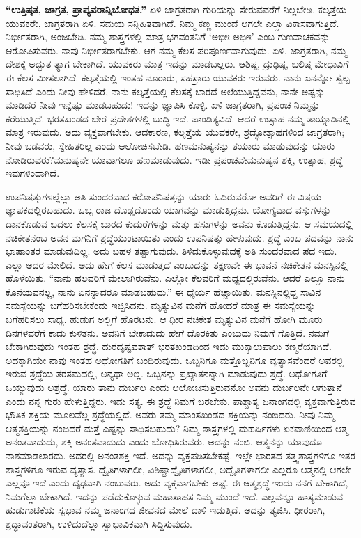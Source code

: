 \textbf{“ಉತ್ತಿಷ್ಠತ, ಜಾಗ್ರತ, ಪ್ರಾಪ್ಯವರಾನ್ನಿಬೋಧತ.”} ಏಳಿ ಜಾಗ್ರತರಾಗಿ ಗುರಿಯನ್ನು ಸೇರುವವರೆಗೆ ನಿಲ್ಲಬೇಡಿ. ಕಲ್ಕತ್ತೆಯ ಯುವಕರೇ, ಜಾಗ್ರತರಾಗಿ ಏಳಿ. ಸಮಯ ಸನ್ನಿಹಿತವಾಗಿದೆ. ನಿಮ್ಮ ಕಣ್ಣ ಮುಂದೆ ಆಗಲೇ ಎಲ್ಲಾ ವಿಕಾಸವಾಗುತ್ತಿದೆ. ನಿರ್ಭೀತರಾಗಿ, ಅಂಜಬೇಡಿ. ನಮ್ಮ ಶಾಸ್ತ್ರಗಳಲ್ಲಿ ಮಾತ್ರ ಭಗವಂತನಿಗೆ ‘ಅಭೀಃ ಅಭೀಃ’ ಎಂಬ ಗುಣವಾಚಕವನ್ನು ಆರೋಪಿಸುವರು. ನಾವು ನಿರ್ಭೀತರಾಗಬೇಕು. ಆಗ ನಮ್ಮ ಕೆಲಸ ಪರಿಪೂರ್ಣವಾಗುವುದು. ಏಳಿ, ಜಾಗ್ರತರಾಗಿ, ನಮ್ಮ ದೇಶಕ್ಕೆ ಅದ್ಭುತ ತ್ಯಾಗ ಬೇಕಾಗಿದೆ. ಯುವಕರು ಮಾತ್ರ ಇದನ್ನು ಮಾಡಬಲ್ಲರು. ಆಶಿಷ್ಠ, ದ್ರುಢಿಷ್ಠ, ಬಲಿಷ್ಠ ಮೇಧಾವಿಗೆ ಈ ಕೆಲಸ ಮೀಸಲಾಗಿದೆ. ಕಲ್ಕತ್ತೆಯಲ್ಲಿ ಇಂತಹ ನೂರಾರು, ಸಹಸ್ರಾರು ಯುವಕರು ಇರುವರು. ನಾನು ಏನನ್ನೋ ಸ್ವಲ್ಪ ಸಾಧಿಸಿದೆ ಎಂದು ನೀವು ಹೇಳಿದರೆ, ನಾನು ಕಲ್ಕತ್ತೆಯಲ್ಲಿ ಕೆಲಸಕ್ಕೆ ಬಾರದೆ ಅಲೆಯುತ್ತಿದ್ದವನು, ನಾನೇ ಅಷ್ಟನ್ನು ಮಾಡಿದರೆ ನೀವು ಇನ್ನೆಷ್ಟು ಮಾಡಬಹುದು! ಇದನ್ನು ಜ್ಞಾಪಿಸಿ ಕೊಳ್ಳಿ. ಏಳಿ ಜಾಗ್ರತರಾಗಿ, ಪ್ರಪಂಚ ನಿಮ್ಮನ್ನು ಕರೆಯುತ್ತಿದೆ. ಭರತಖಂಡದ ಬೇರೆ ಪ್ರದೇಶಗಳಲ್ಲಿ ಬುದ್ಧಿ ಇದೆ. ಪಾಂಡಿತ್ಯವಿದೆ. ಆದರೆ ಉತ್ಸಾಹ ನಮ್ಮ ತಾಯ್ನಾಡಿನಲ್ಲಿ ಮಾತ್ರ ಇರುವುದು. ಅದು ವ್ಯಕ್ತವಾಗಬೇಕು. ಆದಕಾರಣ, ಕಲ್ಕತ್ತೆಯ ಯುವಕರೇ, ಶ್ರದ್ಧೋತ್ಸಾಹಗಳಿಂದ ಜಾಗ್ರತರಾಗಿ; ನೀವು ಬಡವರು, ಸ್ನೇಹಿತರಿಲ್ಲ ಎಂದು ಆಲೋಚಿಸಬೇಡಿ. ಹಣ\break ಮನುಷ್ಯನನ್ನು ತಯಾರು ಮಾಡುವುದನ್ನು ಯಾರು ನೋಡಿರುವರು?\break ಮನುಷ್ಯನೇ ಯಾವಾಗಲೂ ಹಣಮಾಡುವುದು. ಇಡೀ ಪ್ರಪಂಚವೇ\break ಮನುಷ್ಯನ ಶಕ್ತಿ, ಉತ್ಸಾಹ, ಶ್ರದ್ಧೆ ಇವುಗಳಿಂದಾಗಿದೆ.

ಉಪನಿಷತ್ತುಗಳಲ್ಲೆಲ್ಲಾ ಅತಿ ಸುಂದರವಾದ ಕಠೋಪನಿಷತ್ತನ್ನು ಯಾರು ಓದಿರುವರೋ ಅವರಿಗೆ ಈ ವಿಷಯ ಜ್ಞಾಪಕದಲ್ಲಿರಬಹುದು. ಒಬ್ಬ ರಾಜ ದೊಡ್ಡದೊಂದು ಯಾಗವನ್ನು ಮಾಡುತ್ತಿದ್ದನು. ಯೋಗ್ಯವಾದ ವಸ್ತುಗಳನ್ನು ದಾನಕೊಡುವ ಬದಲು ಕೆಲಸಕ್ಕೆ ಬಾರದ ಕುದುರೆಗಳನ್ನು ಮತ್ತು ಹಸುಗಳನ್ನು ಅವನು ಕೊಡುತ್ತಿದ್ದನು. ಆ ಸಮಯದಲ್ಲಿ ನಚಿಕೇತನೆಂಬ ಅವನ ಮಗನಿಗೆ ಶ್ರದ್ಧೆಯುಂಟಾಯಿತು ಎಂದು ಉಪನಿಷತ್ತು ಹೇಳುವುದು. ಶ್ರದ್ಧೆ ಎಂಬ ಪದವನ್ನು ನಾನು ಭಾಷಾಂತರ ಮಾಡುವುದಿಲ್ಲ. ಅದು ಬಹಳ ತಪ್ಪಾಗುವುದು. ತಿಳಿದುಕೊಳ್ಳುವುದಕ್ಕೆ ಅತಿ ಸುಂದರವಾದ ಪದ ಇದು. ಎಲ್ಲಾ ಅದರ ಮೇಲಿದೆ. ಅದು ಹೇಗೆ ಕೆಲಸ ಮಾಡುತ್ತದೆ ಎಂಬುದನ್ನು ತಕ್ಷಣವೇ ಈ ಭಾವನೆ ನಚಿಕೇತನ ಮನಸ್ಸಿನಲ್ಲಿ ಹೊಳೆಯಿತು. “ನಾನು ಹಲವರಿಗೆ ಮೇಲಾಗಿರುವೆನು. ಎಲ್ಲೋ ಕೆಲವರಿಗೆ ಮಧ್ಯದಲ್ಲಿರುವೆನು. ಆದರೆ ಎಲ್ಲೂ ನಾನು ಕೊನೆಯವನಲ್ಲ, ನಾನು ಏನನ್ನಾದರೂ ಮಾಡಬಹುದು.” ಈ ಧೈರ್ಯ ಹೆಚ್ಚಾಯಿತು. ಮನಸ್ಸಿನಲ್ಲಿದ್ದ ಸಾವಿನ ಸಮಸ್ಯೆಯನ್ನು ಬಗೆಹರಿಸಬೇಕೆಂದು ಇಚ್ಛಿಸಿದನು. ಮೃತ್ಯುವಿನ ಮನೆಗೆ ಹೋದರೆ ಮಾತ್ರ ಈ ಸಮಸ್ಯೆಯನ್ನು ಬಗೆಹರಿಸಲು ಸಾಧ್ಯ. ಹುಡುಗ ಅಲ್ಲಿಗೆ ಹೊರಟನು. ಆ ಧೀರ ನಚಿಕೇತ ಮೃತ್ಯುವಿನ ಮನೆಗೆ ಹೋಗಿ ಮೂರು ದಿನಗಳವರೆಗೆ ಕಾದು ಕುಳಿತನು. ಅವನಿಗೆ ಬೇಕಾದುದು ಹೇಗೆ ದೊರಕಿತು ಎಂಬುದು ನಿಮಗೆ ಗೊತ್ತಿದೆ. ನಮಗೆ ಬೇಕಾಗಿರುವುದು ಇಂತಹ ಶ್ರದ್ಧೆ. ದುರದೃಷ್ಟವಶಾತ್​ ಭರತಖಂಡದಿಂದ ಇದು ಮುಕ್ಕಾಲುಪಾಲು ಕಣ್ಮರೆಯಾಗಿದೆ. ಅದಕ್ಕಾಗಿಯೇ ನಾವು ಇಂತಹ ಅಧೋಗತಿಗೆ ಬಂದಿರುವುದು. ಒಬ್ಬನಿಗೂ ಮತ್ತೊಬ್ಬನಿಗೂ ವ್ಯತ್ಯಾಸವೆಂದರೆ ಅವರಲ್ಲಿ ಇರುವ ಶ್ರದ್ಧೆಯ ತರತಮದಲ್ಲಿ, ಅನ್ಯಥಾ ಅಲ್ಲ. ಒಬ್ಬನನ್ನು ಪ್ರಖ್ಯಾತನನ್ನಾಗಿ ಮಾಡುವುದು ಶ್ರದ್ಧೆ. ಅಧೋಗತಿಗೆ ಒಯ್ಯುವುದು ಅಶ್ರದ್ಧೆ. ಯಾರು ತಾನು ದುರ್ಬಲ ಎಂದು ಆಲೋಚಿಸುತ್ತಿರುವನೋ ಅವನು ದುರ್ಬಲನೇ ಆಗುತ್ತಾನೆ ಎಂದು ನನ್ನ ಗುರು ಹೇಳುತ್ತಿದ್ದರು. ಇದು ಸತ್ಯ. ಈ ಶ್ರದ್ಧೆ ನಿಮಗೆ ಬರಬೇಕು. ಪಾಶ್ಚಾತ್ಯ ಜನಾಂಗದಲ್ಲಿ ವ್ಯಕ್ತವಾಗುತ್ತಿರುವ ಭೌತಿಕ ಶಕ್ತಿಯ ಮೂಲವೆಲ್ಲ ಶ್ರದ್ಧೆಯಲ್ಲಿದೆ. ಅವರು ತಮ್ಮ ಮಾಂಸಖಂಡದ ಶಕ್ತಿಯನ್ನು ನಂಬಿದರು. ನೀವು ನಿಮ್ಮ ಆತ್ಮಶಕ್ತಿಯನ್ನು ನಂಬಿದರೆ ಮತ್ತೆ ಎಷ್ಟನ್ನು ಸಾಧಿಸಬಹುದು? ನಿಮ್ಮ ಶಾಸ್ತ್ರಗಳಲ್ಲಿ ಮಹರ್ಷಿಗಳು ಏಕವಾಣಿಯಿಂದ ಆತ್ಮ ಅನಂತವಾದುದು, ಶಕ್ತಿ ಅನಂತವಾದುದು ಎಂದು ಬೋಧಿಸಿರುವರು. ಅದನ್ನು ನಂಬಿ. ಆತ್ಮನನ್ನು ಯಾವುದೂ ನಾಶಮಾಡಲಾರದು. ಅದರಲ್ಲಿ ಅನಂತಶಕ್ತಿ ಇದೆ. ಅದನ್ನು ವ್ಯಕ್ತಪಡಿಸಬೇಕಷ್ಟೆ. ಇಲ್ಲೇ ಭಾರತದ ತತ್ತ್ವಶಾಸ್ತ್ರಗಳಿಗೂ ಇತರ ಶಾಸ್ತ್ರಗಳಿಗೂ ಇರುವ ವ್ಯತ್ಯಾಸ. ದ್ವೈತಿಗಳಾಗಲೀ, ವಿಶಿಷ್ಟಾದ್ವೈತಿಗಳಾಗಲೀ, ಅದ್ವೈತಿಗಳಾಗಲೀ ಎಲ್ಲರೂ ಆತ್ಮನಲ್ಲಿ ಆಗಲೇ ಎಲ್ಲವೂ ಇದೆ ಎಂದು ದೃಢವಾಗಿ ನಂಬುವರು. ಅದು ವ್ಯಕ್ತವಾಗಬೇಕು ಅಷ್ಟೆ. ಈ ಆತ್ಮಶ್ರದ್ಧೆ ಇಂದು ನನಗೆ ಬೇಕಾಗಿದೆ, ನಿಮಗೆಲ್ಲಾ ಬೇಕಾಗಿದೆ. ಇದನ್ನು ಪಡೆದುಕೊಳ್ಳುವ ಮಹಾಸಾಹಸ ನಿಮ್ಮ ಮುಂದೆ ಇದೆ. ಎಲ್ಲವನ್ನೂ ಹಾಸ್ಯಮಾಡುವ ಹುಡುಗಾಟಿಕೆಯ ಸ್ವಭಾವ ನಮ್ಮ ಜನಾಂಗದ ಜೀವನದ ಮೇಲೆ ದಾಳಿ ಇಡುತ್ತಿದೆ. ಅದನ್ನು ತ್ಯಜಿಸಿ. ಧೀರರಾಗಿ, ಶ್ರದ್ಧಾವಂತರಾಗಿ, ಉಳಿದುದೆಲ್ಲಾ ಸ್ವಾಭಾವಿಕವಾಗಿ ಸಿದ್ಧಿಸುವುದು.

